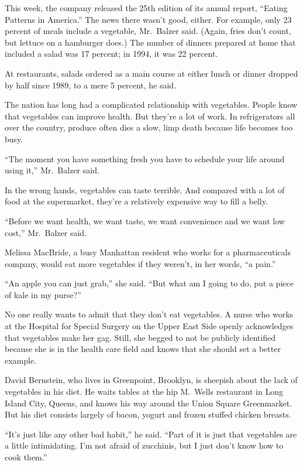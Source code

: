 ﻿\documentclass[12pt]{article}
\begin{document}
This week, the company released the 25th edition of its annual report, ``Eating Patterns in
America.'' The news there wasn't good, either. For example, only 23 percent of meals include a
vegetable, Mr.~Balzer said. (Again, fries don't count, but lettuce on a hamburger does.) The number
of dinners prepared at home that included a salad was 17 percent; in 1994, it was 22 percent.

At restaurants, salads ordered as a main course at either lunch or dinner dropped by half since
1989, to a mere 5 percent, he said.

The nation has long had a complicated relationship with vegetables. People know that vegetables can
improve health. But they're a lot of work. In refrigerators all over the country, produce often dies
a slow, limp death because life becomes too busy.

``The moment you have something fresh you have to schedule your life around using it,'' Mr.~Balzer
said.

In the wrong hands, vegetables can taste terrible. And compared with a lot of food at the
supermarket, they're a relatively expensive way to fill a belly.

``Before we want health, we want taste, we want convenience and we want low cost,'' Mr.~Balzer said.

Melissa MacBride, a busy Manhattan resident who works for a pharmaceuticals company, would eat more
vegetables if they weren't, in her words, ``a pain.''

``An apple you can just grab,'' she said. ``But what am I going to do, put a piece of kale in my
purse?''

No one really wants to admit that they don't eat vegetables. A nurse who works at the Hospital for
Special Surgery on the Upper East Side openly acknowledges that vegetables make her gag. Still, she
begged to not be publicly identified because she is in the health care field and knows that she
should set a better example.

David Bernstein, who lives in Greenpoint, Brooklyn, is sheepish about the lack of vegetables in his
diet. He waits tables at the hip M.~Wells restaurant in Long Island City, Queens, and knows his way
around the Union Square Greenmarket. But his diet consists largely of bacon, yogurt and frozen
stuffed chicken breasts.

``It's just like any other bad habit,'' he said. ``Part of it is just that vegetables are a little
intimidating. I'm not afraid of zucchinis, but I just don't know how to cook them.''
\end{document}
